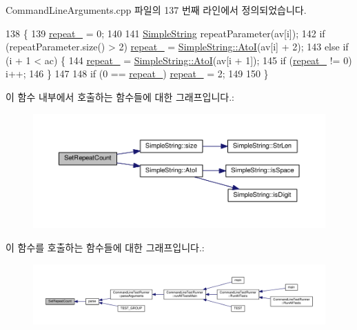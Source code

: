 Command\+Line\+Arguments.\+cpp 파일의 137 번째 라인에서 정의되었습니다.


\begin{DoxyCode}
138 \{
139     \hyperlink{class_command_line_arguments_ae817df6683a04a17ebb450687325eb8d}{repeat\_} = 0;
140 
141     \hyperlink{class_simple_string}{SimpleString} repeatParameter(av[i]);
142     \textcolor{keywordflow}{if} (repeatParameter.size() > 2) \hyperlink{class_command_line_arguments_ae817df6683a04a17ebb450687325eb8d}{repeat\_} = \hyperlink{class_simple_string_a48b8491201bc1c032019324822db317e}{SimpleString::AtoI}(av[i] + 2);
143     \textcolor{keywordflow}{else} \textcolor{keywordflow}{if} (i + 1 < ac) \{
144         \hyperlink{class_command_line_arguments_ae817df6683a04a17ebb450687325eb8d}{repeat\_} = \hyperlink{class_simple_string_a48b8491201bc1c032019324822db317e}{SimpleString::AtoI}(av[i + 1]);
145         \textcolor{keywordflow}{if} (\hyperlink{class_command_line_arguments_ae817df6683a04a17ebb450687325eb8d}{repeat\_} != 0) i++;
146     \}
147 
148     \textcolor{keywordflow}{if} (0 == \hyperlink{class_command_line_arguments_ae817df6683a04a17ebb450687325eb8d}{repeat\_}) \hyperlink{class_command_line_arguments_ae817df6683a04a17ebb450687325eb8d}{repeat\_} = 2;
149 
150 \}
\end{DoxyCode}


이 함수 내부에서 호출하는 함수들에 대한 그래프입니다.\+:
\nopagebreak
\begin{figure}[H]
\begin{center}
\leavevmode
\includegraphics[width=350pt]{class_command_line_arguments_a5469c3237a8eeeebb60d07e10eb73890_cgraph}
\end{center}
\end{figure}




이 함수를 호출하는 함수들에 대한 그래프입니다.\+:
\nopagebreak
\begin{figure}[H]
\begin{center}
\leavevmode
\includegraphics[width=350pt]{class_command_line_arguments_a5469c3237a8eeeebb60d07e10eb73890_icgraph}
\end{center}
\end{figure}


